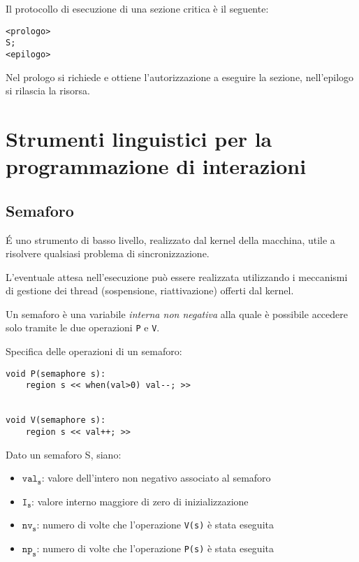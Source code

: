Il protocollo di esecuzione di una sezione critica è il seguente:
\begin{verbatim}
<prologo>
S;
<epilogo>
\end{verbatim}

Nel prologo si richiede e ottiene l'autorizzazione a eseguire la sezione, nell'epilogo si rilascia la risorsa.

\section{Strumenti linguistici per la programmazione di interazioni}

\subsection{Semaforo}
É uno strumento di basso livello, realizzato dal kernel della macchina, utile a risolvere qualsiasi problema di sincronizzazione.

L'eventuale attesa nell'esecuzione può essere realizzata utilizzando i meccanismi di gestione dei thread (sospensione, riattivazione) offerti dal kernel.

Un semaforo è una variabile \textit{interna non negativa} alla quale è possibile accedere solo tramite le due operazioni \texttt{P} e \texttt{V}.

Specifica delle operazioni di un semaforo:
\begin{verbatim}
void P(semaphore s):
    region s << when(val>0) val--; >>


void V(semaphore s):
    region s << val++; >>
\end{verbatim}

Dato un semaforo S, siano:
\begin{itemize}
    \item $\texttt{val}_\texttt{s}$: valore dell'intero non negativo associato al semaforo
    \item $\texttt{I}_\texttt{s}$: valore interno maggiore di zero di inizializzazione
    \item $\texttt{nv}_\texttt{s}$: numero di volte che l'operazione \texttt{V(s)} è stata eseguita
    \item $\texttt{np}_\texttt{s}$: numero di volte che l'operazione \texttt{P(s)} è stata eseguita
\end{itemize}

